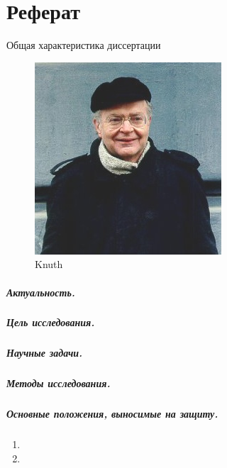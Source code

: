 \chapter*{Реферат}

\begin{center}
    Общая характеристика диссертации
\end{center}

\begin{figure}
    \centering
    \includegraphics[width=0.6\linewidth]{images/knuth}
    \caption{Knuth}
    \label{fig:my_label2}
\end{figure}


\paragraph*{Актуальность.}

\paragraph*{Цель исследования.}
\paragraph*{Научные задачи.}

\paragraph*{Методы исследования.}

\paragraph*{Основные положения, выносимые на защиту.}
\begin{enumerate}
    \item \statementOneRU
    \item \statementTwoRU 
\end{enumerate}

